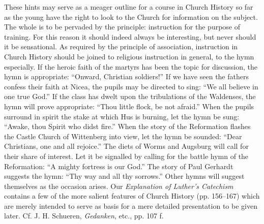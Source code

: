 These hints may serve as a meager outline for a course in Church History so far as the young have the right to look to the Church for information on the subject. The whole is to be pervaded by the principle: instruction for the purpose of training. For this reason it should indeed always be interesting, but never should it be sensational. As required by the principle of association, instruction in Church History should be joined to religious instruction in general, to the hymn especially. If the heroic faith of the martyrs has been the topic for discussion, the hymn is appropriate: “Onward, Christian soldiers!” If we have seen the fathers confess their faith at Nicea, the pupils may be directed to sing: “We all believe in one true God.” If the class has dwelt upon the tribulations of the Waldenses, the hymn will prove appropriate: “Thou little flock, be not afraid.” When the pupils surround in spirit the stake at which Hus is burning, let the hymn be sung: “Awake, thou Spirit who didst fire.” When the story of the Reformation flashes the Castle Church
of Wittenberg into view, let the hymn be sounded: “Dear Christians, one and all rejoice.” The diets of Worms and Augsburg will call for their share of interest. Let it be signalled by calling for the battle hymn of the Reformation: “A mighty fortress is our God.” The story of Paul Gerhardt suggests the hymn: “Thy way and all thy sorrows.” Other hymns will suggest themselves as the occasion arises. Our \emph{Explanation of Luther’s Catechism} contains a few of the more salient features of Church History (pp. 156–167) which are merely intended to serve as basis for a mere detailed presentation to be given later. Cf. J. H. Schueren, \emph{Gedanken}, etc., pp. 107 f.

